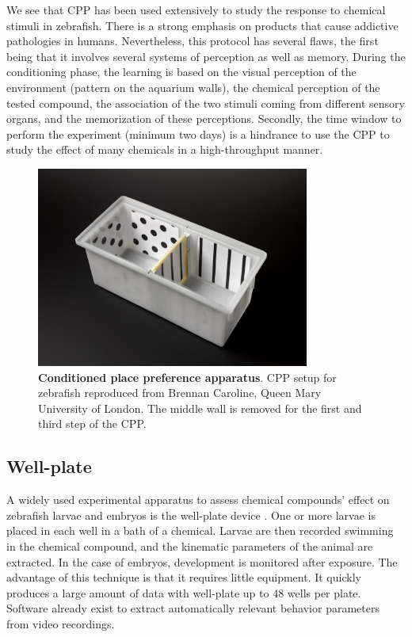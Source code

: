     We see that CPP has been used extensively to study the response to chemical stimuli in zebrafish. There is a strong emphasis on products that cause addictive pathologies in humans. Nevertheless, this protocol has several flaws, the first being that it involves several systems of perception as well as memory. During the conditioning phase, the learning is based on the visual perception of the environment (pattern on the aquarium walls), the chemical perception of the tested compound, the association of the two stimuli coming from different sensory organs, and the memorization of these perceptions. Secondly, the time window to perform the experiment (minimum two days) is a hindrance to use the CPP to study the effect of many chemicals in a high-throughput manner.

    \begin{figure}[h]
      \centering
      \includegraphics[width=0.8\textwidth]{part_2/assets/cpp.jpg}
      \caption{\textbf{Conditioned place preference apparatus}.  CPP setup for zebrafish reproduced from Brennan Caroline, Queen Mary University of London. The middle wall is removed for the first and third step of the CPP.}
      \label{cpp_schematic}
    \end{figure}

    \subsection{Well-plate}
    A widely used experimental apparatus to assess chemical compounds' effect on zebrafish larvae and embryos is the well-plate device \cite{rennekamp201515}. One or more larvae is placed in each well in a bath of a chemical. Larvae are then recorded swimming in the chemical compound, and the kinematic parameters of the animal are extracted. In the case of embryos, development is monitored after exposure. The advantage of this technique is that it requires little equipment. It quickly produces a large amount of data with well-plate up to 48 wells per plate. Software already exist to extract automatically relevant behavior parameters from video recordings.

